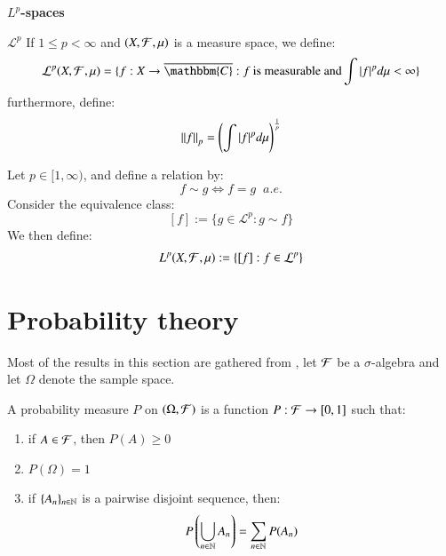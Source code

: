 \centerline{\textbf{$L^{p}$-spaces}}

\begin{definition}{\textbf{$\mathcal{L}^{p}$}}
If $1 \leq p < \infty$ and $(X,\mathcal{F}, \mu)$ is a measure space, we define: 
\begin{align*}
\mathcal{L}^{p}(X,\F, \mu) = 
\{
f:X \to \overline{\mathbbm{C}}: f\:\text{is measurable and}
\int |f|^{p}d\mu < \infty
\}
\end{align*}
furthermore, define: 
\begin{align*}
\norm{f}_{p} = \left(\int |f|^{p}d\mu \right)^{\frac{1}{p}}    
\end{align*}
\end{definition}

\begin{definition}[$L^{p}$]
Let $p \in [1,\infty)$, and define a relation by: 
\[
f \sim g \iff f = g\;\; a.e.
\] 
Consider the equivalence class:
\[
[f]:= \{g \in \mathcal{L}^{p}: g \sim f\}
\]
We then define: 
\begin{align*}
L^{p}(X,\mathcal{F}, \mu) := \{[f]: f\in \mathcal{L}^{p}\}    
\end{align*}
\end{definition}











\newpage 

\section{Probability theory}

Most of the results in this section are gathered from \cite{walsh2012knowing}, let $\mathcal{F}$ be a $\sigma$-algebra and let $\Omega$ denote the sample space. 

\begin{definition}
A probability measure $P$ on $(\Omega, \mathcal{F})$ is a function $P:\mathcal{F} \to [0,1]$ such that: 
\begin{enumerate}[label = (\roman*), , leftmargin=*]
    \item if $A \in \mathcal{F} $, then $P(A)\geq 0$
    \item $P(\Omega) = 1$
    \item if $\{A_{n}\}_{n\in \mathbb{N}}$ is a pairwise disjoint sequence, then: 
    \[P\left(\bigcup_{n\in \mathbb{N}}A_{n}\right) = \sum_{n\in \mathbb{N}}P(A_{n})\]
\end{enumerate}
\end{definition}

